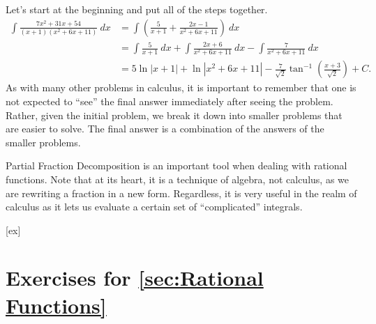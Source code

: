 \begin{solution}
{Let's start at the beginning and put all of the steps together.
\small\begin{align*}
\int\frac{7x^2+31x+54}{(x+1)(x^2+6x+11)}\ dx &= \int\left(\frac{5}{x+1} + \frac{2x-1}{x^2+6x+11}\right)\ dx \\
			&= \int\frac{5}{x+1}\ dx  + \int\frac{2x+6}{x^2+6x+11}\ dx -\int\frac{7}{x^2+6x+11}\ dx \\
			&= 5\ln|x+1|+ \ln|x^2+6x+11| -\frac{7}{\sqrt{2}}\tan^{-1}\left(\frac{x+3}{\sqrt{2}}\right)+C.
\end{align*}\normalsize
As with many other problems in calculus, it is important to remember that one is not expected to ``see'' the final answer immediately after seeing the problem. Rather, given the initial problem, we break it down into smaller problems that are easier to solve. The final answer is a combination of the answers of the smaller problems.
}\\
\end{solution}



Partial Fraction Decomposition is an important tool when dealing with rational functions. Note that at its heart, it is a technique of algebra, not calculus, as we are rewriting a fraction in a new form. Regardless, it is very useful in the realm of calculus as it lets us evaluate a certain set of ``complicated'' integrals.


[ex]
\section*{Exercises for \ref{sec:Rational Functions}}

